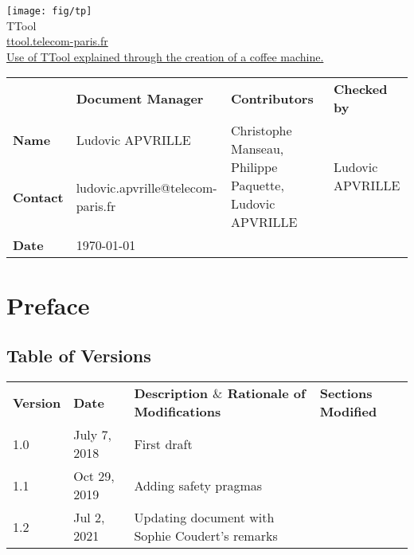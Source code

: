 \documentclass[12pt]{article}
\begin{document}
\sloppy 

\begin{center}

\texttt{[image: fig/tp]}
\vspace{10 pt}\\
\Huge TTool \\
\vspace{10 pt}
\Large \url{ttool.telecom-paris.fr}
\vspace{20 pt}\\
\underline{\Large Use of TTool explained through the creation of a coffee machine.}
\vspace{30 pt}
\end{center}

\begin{table}[H]
\large
\centering
\begin{adjustbox}{width=\textwidth}
\begin{tabular}{ |p{1.6cm}|p{6.0cm}|p{4.2cm}|p{4.2cm}| }
\hhline{----}
 & \textbf{Document Manager} & \textbf{Contributors}  & \textbf{Checked by}  \\ 
\hhline{----}
\textbf{Name}   & Ludovic APVRILLE & \multirow{2}{4.2cm}{Christophe Manseau, Philippe Paquette,
Ludovic APVRILLE} &
\multirow{2}{*}{Ludovic APVRILLE} \\
\hhline{--~~}
\textbf{Contact} & ludovic.apvrille@telecom-paris.fr &  &  \\ 
\hhline{--~~}
\textbf{Date} & \today &  &  \\ 
\hline
\end{tabular}
\end{adjustbox}
\end{table}

\newpage
\tableofcontents


\newpage
\section{Preface}

\subsection{Table of Versions}

\begin{table}[H]
\large
\centering
\begin{adjustbox}{width=\textwidth}
\begin{tabular}{ |p{1.5cm}|p{2.5cm}|p{9.0cm}|p{3.0cm}| }
\hhline{----}
\textbf{Version} & \textbf{Date} & \textbf{Description  $  \&  $  Rationale of
Modifications} & \textbf{Sections Modified} \\
\hhline{----}
1.0 & July 7, 2018 & First draft &  \\ 
\hline
1.1 & Oct 29, 2019 & Adding safety pragmas &  \\ 
\hline
1.2 & Jul 2, 2021 & Updating document with Sophie Coudert's remarks &  \\ 
\hline
\end{tabular}
\end{adjustbox}
\end{table}
\end{document}
